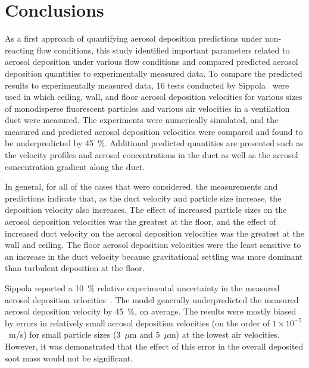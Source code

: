 \section{Conclusions}
\label{sec:Conclusions}

As a first approach of quantifying aerosol deposition predictions under non-reacting flow conditions, this study identified important parameters related to aerosol deposition under various flow conditions and compared predicted aerosol deposition quantities to experimentally measured data. To compare the predicted results to experimentally measured data, 16 tests conducted by Sippola~\cite{Sippola:1} were used in which ceiling, wall, and floor aerosol deposition velocities for various sizes of monodisperse fluorescent particles and various air velocities in a ventilation duct were measured. The experiments were numerically simulated, and the measured and predicted aerosol deposition velocities were compared and found to be underpredicted by 45~\%. Additional predicted quantities are presented such as the velocity profiles and aerosol concentrations in the duct as well as the aerosol concentration gradient along the duct.

In general, for all of the cases that were considered, the measurements and predictions indicate that, as the duct velocity and particle size increase, the deposition velocity also increases. The effect of increased particle sizes on the aerosol deposition velocities was the greatest at the floor, and the effect of increased duct velocity on the aerosol deposition velocities was the greatest at the wall and ceiling. The floor aerosol deposition velocities were the least sensitive to an increase in the duct velocity because gravitational settling was more dominant than turbulent deposition at the floor.

Sippola reported a 10~\% relative experimental uncertainty in the measured aerosol deposition velocities~\cite{Sippola:2002}. The model generally underpredicted the measured aerosol deposition velocity by 45~\%, on average. The results were mostly biased by errors in relatively small aerosol deposition velocities (on the order of $1 \times 10^{-5}$~m/s) for small particle sizes (3~$\mu$m and 5~$\mu$m) at the lowest air velocities. However, it was demonstrated that the effect of this error in the overall deposited soot mass would not be significant.


